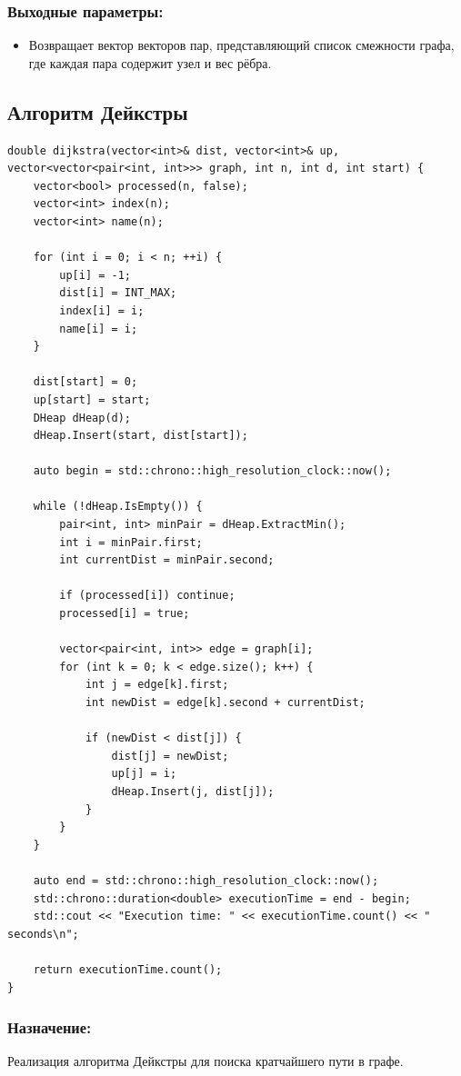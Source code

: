 \subsubsection*{Выходные параметры:}
\begin{itemize}
    \item Возвращает вектор векторов пар, представляющий список смежности графа, где каждая пара содержит узел и вес рёбра.
\end{itemize}

\subsection*{Алгоритм Дейкстры}
\begin{verbatim}
double dijkstra(vector<int>& dist, vector<int>& up, 
vector<vector<pair<int, int>>> graph, int n, int d, int start) {
    vector<bool> processed(n, false);
    vector<int> index(n);
    vector<int> name(n);

    for (int i = 0; i < n; ++i) {
        up[i] = -1;
        dist[i] = INT_MAX;
        index[i] = i;
        name[i] = i;
    }

    dist[start] = 0;
    up[start] = start;
    DHeap dHeap(d);
    dHeap.Insert(start, dist[start]);

    auto begin = std::chrono::high_resolution_clock::now();  

    while (!dHeap.IsEmpty()) {
        pair<int, int> minPair = dHeap.ExtractMin();
        int i = minPair.first;
        int currentDist = minPair.second;

        if (processed[i]) continue; 
        processed[i] = true;

        vector<pair<int, int>> edge = graph[i];
        for (int k = 0; k < edge.size(); k++) {
            int j = edge[k].first;
            int newDist = edge[k].second + currentDist;

            if (newDist < dist[j]) {
                dist[j] = newDist;
                up[j] = i;
                dHeap.Insert(j, dist[j]);
            }
        }
    }

    auto end = std::chrono::high_resolution_clock::now();
    std::chrono::duration<double> executionTime = end - begin;
    std::cout << "Execution time: " << executionTime.count() << " seconds\n";

    return executionTime.count();
}
\end{verbatim}

\subsubsection*{Назначение:}
Реализация алгоритма Дейкстры для поиска кратчайшего пути в графе.

